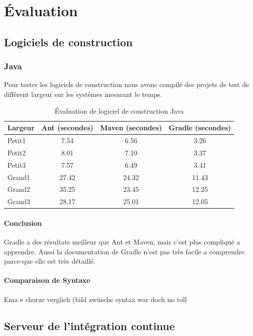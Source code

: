 \chapter{Évaluation}
\label{eval}

\section{Logiciels de construction}
\subsection{Java}
Pour tester les logiciels de construction nous avons compilé des projets de test de différent largeur sur les systèmes mesurant le temps.

\begin{table}[H]
\centering
\begin{tabular}{l|ccc} \toprule
	\textbf{Largeur} & \textbf{Ant (secondes)} & \textbf{Maven (secondes)} & \textbf{Gradle (secondes)}\\ \midrule
	Petit1 & 7.54 & 6.56 & 3.26\\
	Petit2 & 8.01 & 7.10 & 3.37\\
	Petit3 & 7.57 & 6.49 & 3.41\\
	Grand1 & 27.42 & 24.32 & 11.43\\
	Grand2 & 35.25 & 23.45 & 12.25\\
	Grand3 & 28.17 & 25.01 & 12.05\\ \bottomrule
\end{tabular}
\caption{Évaluation de logiciel de construction Java}
\end{table}
\subsubsection{Conclusion}
Gradle a des résultats meilleur que Ant et Maven, mais c'est plus compliqué a apprendre. Aussi la documentation de Gradle n'est pas très facile a comprendre parce-que elle est très détaillé.

\subsubsection{Comparaison de Syntaxe}

Ema e churze verglich (bild zwüsche syntax war doch no toll

\newpage
\section{Serveur de l'intégration continue}

